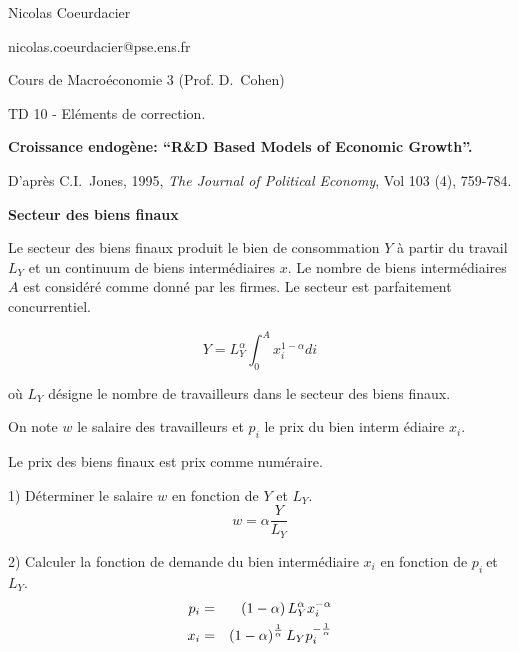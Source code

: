 \documentclass[a4paper]{article}
\begin{document}
{\small Nicolas Coeurdacier}

{\small nicolas.coeurdacier@pse.ens.fr}

{\small Cours de Macro\'{e}conomie 3 (Prof. D.\ Cohen)}

\bigskip

\begin{center}
\bigskip

TD 10 - El\'{e}ments de correction.
\end{center}

\bigskip

\textbf{Croissance endog\`{e}ne: \textquotedblleft R\&D Based Models of
Economic Growth\textquotedblright .}

D'apr\`{e}s C.I.\ Jones, 1995, \textit{The Journal of Political Economy},
Vol 103 (4), 759-784.

\bigskip

\textbf{Secteur des biens finaux}

\bigskip

Le secteur des biens finaux produit le bien de consommation $Y$ \`{a} partir
du travail $L_{Y}$ et un continuum de biens interm\'{e}diaires $x$. Le
nombre de biens interm\'{e}diaires $A$ est consid\'{e}r\'{e} comme donn\'{e}
par les firmes. Le secteur est parfaitement concurrentiel.

\begin{equation*}
Y=L_{Y}^{\alpha }\int_{0}^{A}x_{i}^{1-\alpha }di
\end{equation*}

o\`{u} $L_{Y}$ d\'{e}signe le nombre de travailleurs dans le secteur des
biens finaux.

On note $w$ le salaire des travailleurs et $p_{i}$ le prix du bien interm%
\'{e}diaire $x_{i}$.

Le prix des biens finaux est prix comme num\'{e}raire.

\bigskip

1) D\'{e}terminer le salaire $w$ en fonction de $Y$ et $L_{Y}$.%
\begin{equation*}
w=\alpha \frac{Y}{L_{Y}}
\end{equation*}

2) Calculer la fonction de demande du bien interm\'{e}diaire $x_{i}$ en
fonction de $p_{i}\ $et $L_{Y}$.%
\begin{eqnarray*}
p_{i} &=&\left( 1-\alpha \right) L_{Y}^{\alpha }x_{i}^{-\alpha } \\
x_{i} &=&\left( 1-\alpha \right) ^{\frac{1}{\alpha }}L_{Y}p_{i}^{-\frac{1}{%
\alpha }}
\end{eqnarray*}
\end{document}
